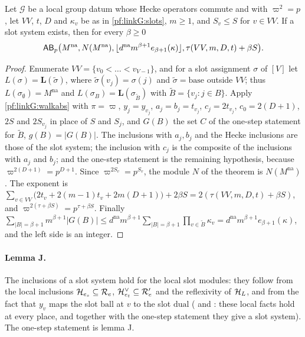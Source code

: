 \begin{corollary}\label{pf:linkG:walk}
Let $\mathcal G$ be a local group datum whose Hecke operators commute and with $\varpi^2=p$, let $VV$, $t$, $D$ and
$\kappa_v$ be as in \cref{pf:linkG:slots}, $m\ge1$, and $S_v\le S$ for $v\in VV$. If a slot system exists, then for every
$\beta\ge0$
\begin{equation}\label{eq:pf:linkG:manyorbits}
\mathsf{AB}_p\bigl(M^{\mathrm{na}},N(M^{\mathrm{na}}),\lfloor d^{\mathrm{na}}m^{\beta+1}e_{\beta+1}(\kappa)\rfloor,\tau(VV,m,D,t)+\beta S\bigr).
\end{equation}
\end{corollary}

\begin{proof}
Enumerate $VV=\{v_0<\dots<v_{V-1}\}$, and for a slot assignment $\sigma$ of $[V]$ let $L(\sigma)=\mathbf L(\tilde\sigma)$,
where $\tilde\sigma(v_j)=\sigma(j)$ and $\tilde\sigma=\mathrm{base}$ outside $VV$; thus $L(\sigma_\emptyset)=M^{\mathrm{na}}$ and
$L(\sigma_B)=\mathbf L(\sigma_{\tilde B})$ with $\tilde B=\{v_j:j\in B\}$. Apply \cref{pf:linkG:walkabs} with $\pi=\varpi$,
$y_j=y_{v_j}$, $a_j=b_j=t_{v_j}$, $c_j=2t_{v_j}$, $c_0=2(D+1)$, $2S$ and $2S_{v_j}$ in place of $S$ and $S_j$, and $G(B)$ the
set $C$ of the one-step statement for $\tilde B$, $g(B)=|G(B)|$. The inclusions with $a_j,b_j$ and the Hecke inclusions are
those of the slot system; the inclusion with $c_j$ is the composite of the inclusions with $a_j$ and $b_j$; and the one-step
statement is the remaining hypothesis, because $\varpi^{2(D+1)}=p^{D+1}$. Since $\varpi^{2S_v}=p^{S_v}$, the module $N$ of the
theorem is $N(M^{\mathrm{na}})$. The exponent is
$\sum_{v\in VV}\bigl(2t_v+2(m-1)t_v+2m(D+1)\bigr)+2\beta S=2(\tau(VV,m,D,t)+\beta S)$, and
$\varpi^{2(\tau+\beta S)}=p^{\tau+\beta S}$. Finally
$\sum_{|B|=\beta+1}m^{\beta+1}|G(B)|\le d^{\mathrm{na}}m^{\beta+1}\sum_{|B|=\beta+1}\prod_{v\in\tilde B}\kappa_v
=d^{\mathrm{na}}m^{\beta+1}e_{\beta+1}(\kappa)$, and the left side is an integer.
\end{proof}

\paragraph{Lemma J.}
The inclusions of a slot system hold for the local slot modules: they follow from the local inclusions
$\mathcal H_{e_s}\subseteq\mathcal R_e$, $\mathcal H_{e_t}^\vee\subseteq\mathcal R'_e$ and the reflexivity of $\mathcal H_L$, and from the fact
that $y_v$ maps the slot $\mathrm{ball}$ at $v$ to the slot $\mathrm{dual}$
( and :
these local facts hold at every place, and together with the one-step statement they give a slot system). The one-step
statement is lemma J.

